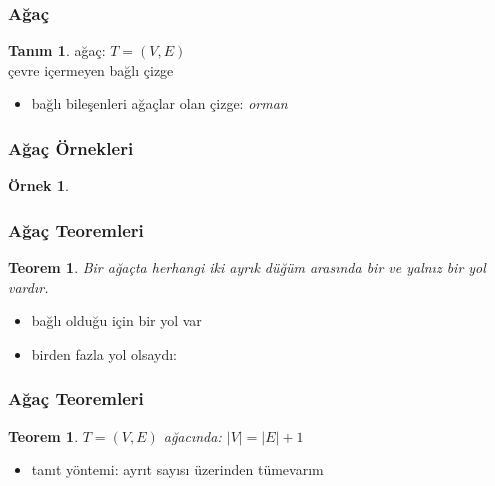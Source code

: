 \documentclass[dvipsnames]{beamer}
\theoremstyle{definition}
\newtheorem{tanim}[theorem]{Tanım}
\theoremstyle{example}
\newtheorem{ornek}[theorem]{Örnek}
\theoremstyle{plain}
\newtheorem{teorem}[theorem]{Teorem}
\begin{document}
\begin{frame}
  \frametitle{Ağaç}

  \begin{tanim}
    \alert{ağaç}: $T=(V,E)$\\
    çevre içermeyen bağlı çizge
  \end{tanim}

  \pause
  \begin{itemize}
    \item bağlı bileşenleri ağaçlar olan çizge: \emph{orman}
  \end{itemize}
\end{frame}

\begin{frame}
  \frametitle{Ağaç Örnekleri}

  \begin{ornek}
    \begin{center}
    \end{center}
  \end{ornek}
\end{frame}

\begin{frame}
  \frametitle{Ağaç Teoremleri}

  \begin{teorem}
    Bir ağaçta herhangi iki ayrık düğüm arasında bir ve yalnız bir yol vardır.
  \end{teorem}

  \begin{itemize}
    \item bağlı olduğu için bir yol var
    \item birden fazla yol olsaydı:
    \begin{center}
    \end{center}
  \end{itemize}
\end{frame}

\begin{frame}
  \frametitle{Ağaç Teoremleri}

  \begin{teorem}
    $T = (V, E)$ ağacında: $|V| = |E| + 1$
  \end{teorem}

  \begin{itemize}
    \item tanıt yöntemi: ayrıt sayısı üzerinden tümevarım
  \end{itemize}
\end{frame}
\end{document}
